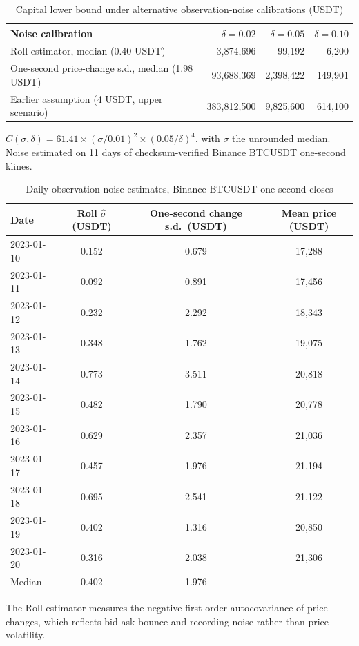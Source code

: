 \documentclass[12pt]{article}
\theoremstyle{definition}
\theoremstyle{remark}
\begin{document}
\begin{table}[t]\centering
\begin{threeparttable}
\caption{Capital lower bound under alternative observation-noise calibrations (USDT)}\label{tab:capital}
\begin{tabular}{lrrr}
\toprule
Noise calibration & $\delta=0.02$ & $\delta=0.05$ & $\delta=0.10$\\
\midrule
Roll estimator, median (0.40 USDT) & 3{,}874{,}696 & 99{,}192 & 6{,}200\\
One-second price-change s.d., median (1.98 USDT) & 93{,}688{,}369 & 2{,}398{,}422 & 149{,}901\\
Earlier assumption (4 USDT, upper scenario) & 383{,}812{,}500 & 9{,}825{,}600 & 614{,}100\\
\bottomrule
\end{tabular}
\begin{tablenotes}\footnotesize
\item $C(\sigma,\delta)=61.41\times(\sigma/0.01)^2\times(0.05/\delta)^4$, with $\sigma$ the unrounded median. Noise estimated on 11 days of checksum-verified Binance BTCUSDT one-second klines. \end{tablenotes}
\end{threeparttable}
\end{table}

\begin{table}[t]\centering\small
\begin{threeparttable}
\caption{Daily observation-noise estimates, Binance BTCUSDT one-second closes}\label{tab:roll}
\begin{tabular}{lccc}
\toprule
Date & Roll $\hat\sigma$ (USDT) & One-second change s.d.\ (USDT) & Mean price (USDT)\\
\midrule
2023-01-10 & 0.152 & 0.679 & 17{,}288\\
2023-01-11 & 0.092 & 0.891 & 17{,}456\\
2023-01-12 & 0.232 & 2.292 & 18{,}343\\
2023-01-13 & 0.348 & 1.762 & 19{,}075\\
2023-01-14 & 0.773 & 3.511 & 20{,}818\\
2023-01-15 & 0.482 & 1.790 & 20{,}778\\
2023-01-16 & 0.629 & 2.357 & 21{,}036\\
2023-01-17 & 0.457 & 1.976 & 21{,}194\\
2023-01-18 & 0.695 & 2.541 & 21{,}122\\
2023-01-19 & 0.402 & 1.316 & 20{,}850\\
2023-01-20 & 0.316 & 2.038 & 21{,}306\\
\midrule
Median & 0.402 & 1.976 & \\
\bottomrule
\end{tabular}
\begin{tablenotes}\footnotesize\item The Roll estimator measures the negative first-order autocovariance of price changes, which reflects bid-ask bounce and recording noise rather than price volatility.\end{tablenotes}
\end{threeparttable}
\end{table}
\end{document}
